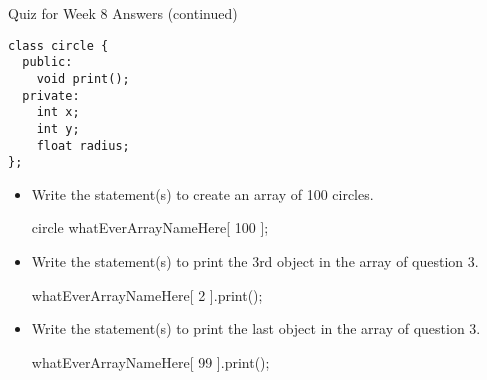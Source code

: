 \documentclass[presentation]{beamer}
\begin{document}
\begin{frame}[fragile,label=sec-3]{Quiz for Week 8 \alert{Answers} (continued)}
 \begin{verbatim}
class circle {
  public:
    void print();
  private:
    int x;
    int y;
    float radius;
};
\end{verbatim}
\begin{itemize}
\item Write the statement(s) to create an array of 100 circles.

\alert{circle whatEverArrayNameHere[ 100 ];}
\item Write the statement(s) to print the 3rd object in the array of question 3.

\alert{whatEverArrayNameHere[ 2 ].print();}
\item Write the statement(s) to print the last object in the array of question 3.

\alert{whatEverArrayNameHere[ 99 ].print();}
\end{itemize}
\end{frame}
\end{document}
